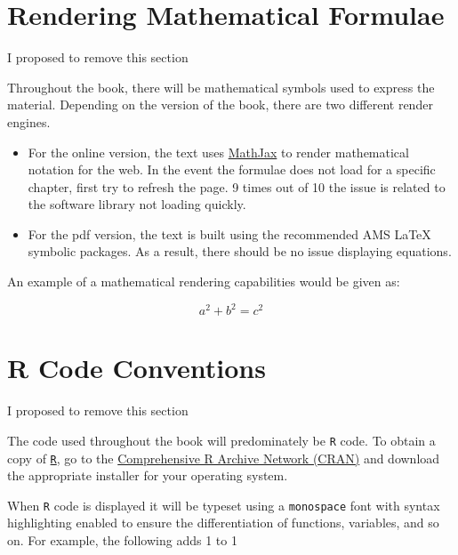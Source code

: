 \documentclass[]{book}
\providecommand{\tightlist}{%
  \setlength{\itemsep}{0pt}\setlength{\parskip}{0pt}}
\theoremstyle{definition}
\theoremstyle{definition}
\theoremstyle{definition}
\theoremstyle{remark}
\begin{document}
\hypertarget{rendering-mathematical-formulae}{%
\section{Rendering Mathematical
Formulae}\label{rendering-mathematical-formulae}}

\begin{rmdcomment}
I proposed to remove this section
\end{rmdcomment}

Throughout the book, there will be mathematical symbols used to express
the material. Depending on the version of the book, there are two
different render engines.

\begin{itemize}
\tightlist
\item
  For the online version, the text uses
  \href{https://www.mathjax.org/}{MathJax} to render mathematical
  notation for the web. In the event the formulae does not load for a
  specific chapter, first try to refresh the page. 9 times out of 10 the
  issue is related to the software library not loading quickly.
\item
  For the pdf version, the text is built using the recommended AMS LaTeX
  symbolic packages. As a result, there should be no issue displaying
  equations.
\end{itemize}

An example of a mathematical rendering capabilities would be given as:

\[ a^2 + b^2 = c^2 \]

\hypertarget{r-code-conventions}{%
\section{R Code Conventions}\label{r-code-conventions}}

\begin{rmdcomment}
I proposed to remove this section
\end{rmdcomment}

The code used throughout the book will predominately be \texttt{R} code.
To obtain a copy of \href{https://cloud.r-project.org/}{\texttt{R}}, go
to the \href{https://cloud.r-project.org/}{Comprehensive R Archive
Network (CRAN)} and download the appropriate installer for your
operating system.

When \texttt{R} code is displayed it will be typeset using a
\texttt{monospace} font with syntax highlighting enabled to ensure the
differentiation of functions, variables, and so on. For example, the
following adds 1 to 1
\end{document}
